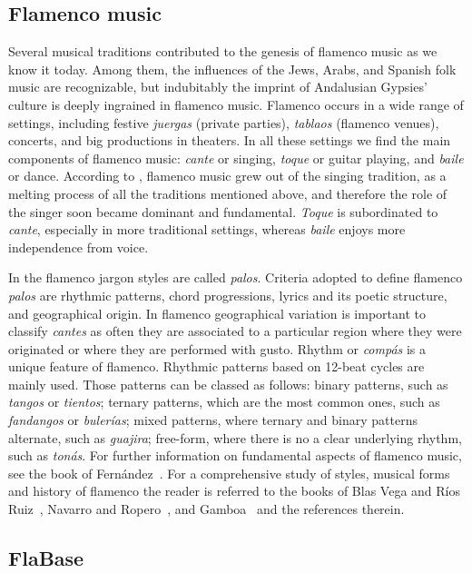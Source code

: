 \subsection{Flamenco music}
\label{sec:musicology:flamenco}

Several musical traditions contributed to the genesis of flamenco music as we know it today. Among them, the influences of the Jews, Arabs, and Spanish folk music are recognizable, but indubitably  the imprint of Andalusian Gypsies' culture is deeply ingrained in flamenco music. 
Flamenco occurs in a wide range of settings, including festive \textit{juergas} (private parties), \textit{tablaos} (flamenco venues), concerts, and big productions in theaters. In all these settings we find the main components of flamenco music: \textit{cante} or singing, \textit{toque} or guitar playing, and \textit{baile} or dance. According to \cite{gamboa-05}, flamenco music grew out of the singing tradition, as a melting process of all the traditions mentioned above, and therefore the role of the singer soon became dominant and fundamental. \textit{Toque}  is subordinated to \textit{cante}, especially in more traditional settings, whereas \textit{baile} enjoys more independence from voice. 

In the flamenco jargon styles are called \textit{palos}. Criteria adopted to define flamenco \textit{palos} are rhythmic patterns, chord progressions, lyrics and its poetic structure, and geographical origin. In flamenco geographical variation is important to classify \textit{cantes} as often they are associated to a particular region where they were originated or where they are performed with gusto. 
Rhythm or \textit{comp\'as} is a unique feature of flamenco.
Rhythmic patterns based on 12-beat cycles are mainly used. Those patterns can be classed as follows: binary patterns, such as \textit{tangos} or \textit{tientos}; ternary patterns, which are the most common ones, such as \textit{fandangos} or \textit{buler\'ias}; mixed patterns, where ternary and binary patterns alternate, such as \textit{guajira}; free-form, where there is no a clear underlying rhythm, such as \textit{ton\'as}.
For further information on fundamental aspects of flamenco music, see the book of Fern\'andez~\citep{fer-04}. For a comprehensive study of styles, musical forms and history of flamenco the reader is referred to the books of Blas Vega and R\'ios Ruiz~\citep{bvrr-88}, Navarro and Ropero~\citep{nr-95}, and Gamboa~\citep{gamboa-05} and the references therein.


\subsection{FlaBase}
\label{sec:musicology:flabase}

